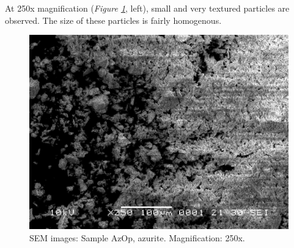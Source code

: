 At 250x magnification (\textit{Figure \ref{fig:azop_sem_3}}, left), small and very textured particles are observed. The size of these particles is fairly homogenous. 

\begin{figure}[H]
\centering
  \includegraphics[width=\linewidth]{AzOp_x250_1_150321}
\caption[SEM images: Sample AzOp, azurite]{SEM images: Sample AzOp, azurite. Magnification: 250x.}
\label{fig:azop_sem_3}
\end{figure}

